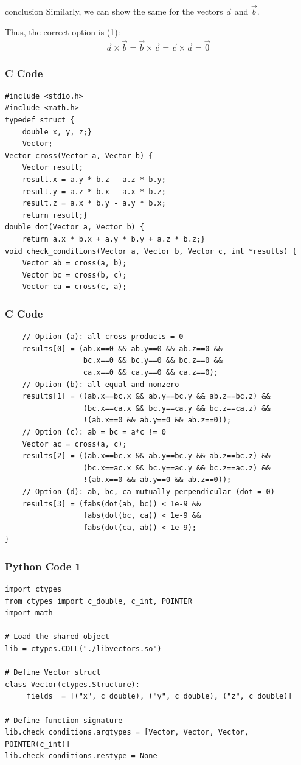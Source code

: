 \documentclass{beamer}
\begin{document}
\begin{frame}{conclusion}
Similarly, we can show the same for the vectors $\vec{a}$ and $\vec{b}$.

Thus, the correct option is (1):
\begin{align}
    \vec{a}\times \vec{b}=\vec{b}\times \vec{c}=\vec{c}\times \vec{a}=\vec{0}
\end{align}
\end{frame}


\begin{frame}[fragile]
    \frametitle{C Code}
    \begin{lstlisting}
#include <stdio.h>
#include <math.h>
typedef struct {
    double x, y, z;} 
    Vector;
Vector cross(Vector a, Vector b) {
    Vector result;
    result.x = a.y * b.z - a.z * b.y;
    result.y = a.z * b.x - a.x * b.z;
    result.z = a.x * b.y - a.y * b.x;
    return result;}
double dot(Vector a, Vector b) {
    return a.x * b.x + a.y * b.y + a.z * b.z;}
void check_conditions(Vector a, Vector b, Vector c, int *results) {
    Vector ab = cross(a, b);
    Vector bc = cross(b, c);
    Vector ca = cross(c, a);
    \end{lstlisting}
\end{frame}

\begin{frame}[fragile]
    \frametitle{C Code}
    \begin{lstlisting}
    // Option (a): all cross products = 0
    results[0] = (ab.x==0 && ab.y==0 && ab.z==0 &&
                  bc.x==0 && bc.y==0 && bc.z==0 &&
                  ca.x==0 && ca.y==0 && ca.z==0);
    // Option (b): all equal and nonzero
    results[1] = ((ab.x==bc.x && ab.y==bc.y && ab.z==bc.z) &&
                  (bc.x==ca.x && bc.y==ca.y && bc.z==ca.z) &&
                  !(ab.x==0 && ab.y==0 && ab.z==0));
    // Option (c): ab = bc = a*c != 0
    Vector ac = cross(a, c);
    results[2] = ((ab.x==bc.x && ab.y==bc.y && ab.z==bc.z) &&
                  (bc.x==ac.x && bc.y==ac.y && bc.z==ac.z) &&
                  !(ab.x==0 && ab.y==0 && ab.z==0));
    // Option (d): ab, bc, ca mutually perpendicular (dot = 0)
    results[3] = (fabs(dot(ab, bc)) < 1e-9 &&
                  fabs(dot(bc, ca)) < 1e-9 &&
                  fabs(dot(ca, ab)) < 1e-9);
}
    \end{lstlisting}
\end{frame}

\begin{frame}[fragile]
    \frametitle{Python Code 1}
    \begin{lstlisting}
import ctypes
from ctypes import c_double, c_int, POINTER
import math

# Load the shared object
lib = ctypes.CDLL("./libvectors.so")

# Define Vector struct
class Vector(ctypes.Structure):
    _fields_ = [("x", c_double), ("y", c_double), ("z", c_double)]

# Define function signature
lib.check_conditions.argtypes = [Vector, Vector, Vector, POINTER(c_int)]
lib.check_conditions.restype = None
    \end{lstlisting}
\end{frame}
\end{document}
